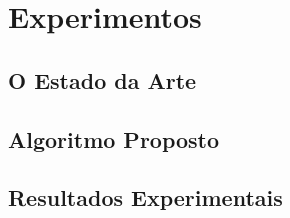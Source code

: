\chapter{Experimentos}
\label{cap:experimentos}

\section{O Estado da Arte}
\label{sec:estado_arte}

\section{Algoritmo Proposto}
\label{sec:algoritmo_proposto}

\section{Resultados Experimentais}
\label{sec:resultados_experimentais}

